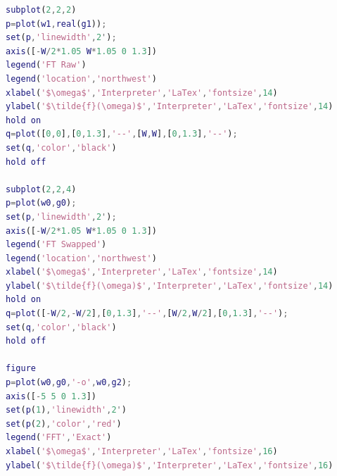 \begin{lstlisting}[language=matlab]
subplot(2,2,2)
p=plot(w1,real(g1));
set(p,'linewidth',2');
axis([-W/2*1.05 W*1.05 0 1.3])
legend('FT Raw')
legend('location','northwest')
xlabel('$\omega$','Interpreter','LaTex','fontsize',14)
ylabel('$\tilde{f}(\omega)$','Interpreter','LaTex','fontsize',14)
hold on
q=plot([0,0],[0,1.3],'--',[W,W],[0,1.3],'--');
set(q,'color','black')
hold off

subplot(2,2,4)
p=plot(w0,g0);
set(p,'linewidth',2');
axis([-W/2*1.05 W*1.05 0 1.3])
legend('FT Swapped')
legend('location','northwest')
xlabel('$\omega$','Interpreter','LaTex','fontsize',14)
ylabel('$\tilde{f}(\omega)$','Interpreter','LaTex','fontsize',14)
hold on
q=plot([-W/2,-W/2],[0,1.3],'--',[W/2,W/2],[0,1.3],'--');
set(q,'color','black')
hold off

figure
p=plot(w0,g0,'-o',w0,g2);
axis([-5 5 0 1.3])
set(p(1),'linewidth',2')
set(p(2),'color','red')
legend('FFT','Exact')
xlabel('$\omega$','Interpreter','LaTex','fontsize',16)
ylabel('$\tilde{f}(\omega)$','Interpreter','LaTex','fontsize',16)
\end{lstlisting}
\normalsize

